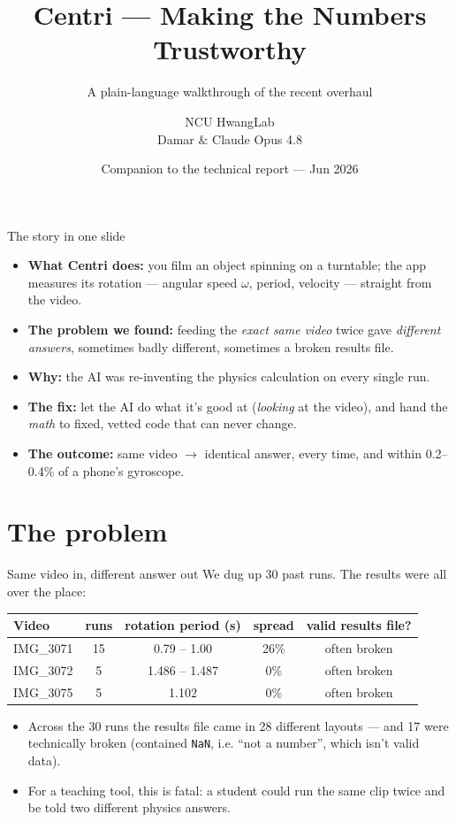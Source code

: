 \documentclass[10pt,aspectratio=169]{beamer}
\title{Centri --- Making the Numbers Trustworthy}
\subtitle{A plain-language walkthrough of the recent overhaul}
\author{NCU HwangLab \\ Damar \& Claude Opus 4.8}
\date{Companion to the technical report --- Jun 2026}
\newcommand{\gd}[1]{\textcolor{good}{#1}}
\newcommand{\bd}[1]{\textcolor{bad}{#1}}
\begin{document}
\maketitle

\begin{frame}{The story in one slide}
\begin{itemize}
  \item \textbf{What Centri does:} you film an object spinning on a turntable; the app measures its rotation --- angular speed $\omega$, period, velocity --- straight from the video.
  \item \textbf{The problem we found:} feeding the \emph{exact same video} twice gave \emph{different answers}, sometimes badly different, sometimes a broken results file.
  \item \textbf{Why:} the AI was re-inventing the physics calculation on every single run.
  \item \textbf{The fix:} let the AI do what it's good at (\emph{looking} at the video), and hand the \emph{math} to fixed, vetted code that can never change.
  \item \textbf{The outcome:} same video $\to$ \gd{identical answer, every time}, and within \gd{0.2--0.4\%} of a phone's gyroscope.
\end{itemize}
\end{frame}

\section{The problem}

\begin{frame}{Same video in, different answer out}
We dug up 30 past runs. The results were all over the place:
\centering\small
\begin{tabular}{lcccc}
\toprule
Video & runs & rotation period (s) & spread & valid results file? \\
\midrule
IMG\_3071 & 15 & \bd{0.79 -- 1.00} & \bd{26\%} & often broken \\
IMG\_3072 & 5  & 1.486 -- 1.487 & 0\% & often broken \\
IMG\_3075 & 5  & 1.102 & 0\% & often broken \\
\bottomrule
\end{tabular}
\par\vspace{0.6em}
\begin{itemize}\footnotesize
  \item Across the 30 runs the results file came in \bd{28 different layouts} --- and \bd{17 were technically broken} (contained \texttt{NaN}, i.e. ``not a number'', which isn't valid data).
  \item For a teaching tool, this is fatal: a student could run the same clip twice and be told two different physics answers.
\end{itemize}
\end{frame}
\end{document}
